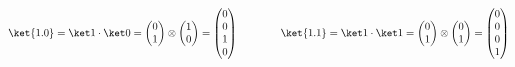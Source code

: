 \documentclass[11pt,class=report,crop=false]{standalone}
\begin{document}
$$\ket{1.0} = \ket1 \cdot \ket0 =   \begin{pmatrix}0\\1\end{pmatrix} \otimes \begin{pmatrix}1\\0\end{pmatrix} = \begin{pmatrix}0\\0\\1\\0\end{pmatrix}
\qquad\qquad
\ket{1.1} = \ket1 \cdot \ket1 =   \begin{pmatrix}0\\1\end{pmatrix} \otimes \begin{pmatrix}0\\1\end{pmatrix} = \begin{pmatrix}0\\0\\0\\1\end{pmatrix}$$
\end{document}
